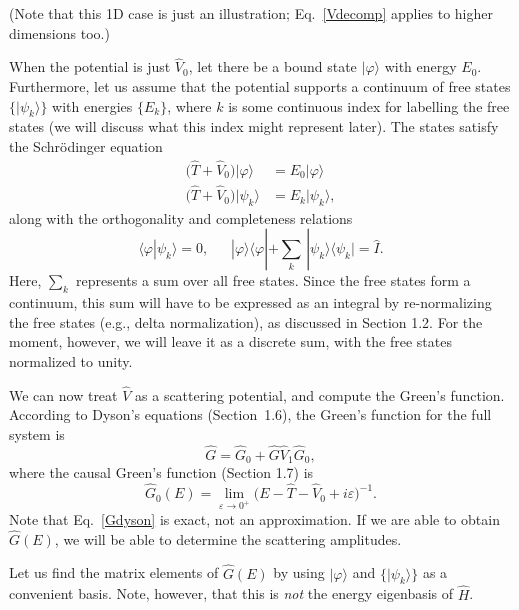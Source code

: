 \documentclass[pra,12pt]{revtex4}
\begin{document}
\noindent
(Note that this 1D case is just an illustration; Eq.~\eqref{Vdecomp}
applies to higher dimensions too.)

When the potential is just $\hat{V}_0$, let there be a bound state
$|\varphi\rangle$ with energy $E_0$.  Furthermore, let us assume that
the potential supports a continuum of free states $\{|\psi_k\rangle\}$
with energies $\{E_k\}$, where $k$ is some continuous index for
labelling the free states (we will discuss what this index might
represent later).  The states satisfy the Schr\"odinger equation
\begin{align}
  \big(\hat{T} + \hat{V}_0\big) |\varphi\rangle \; &= E_0 |\varphi\rangle \\ \big(\hat{T} + \hat{V}_0\big) |\psi_k\rangle &= E_k |\psi_k\rangle,
\end{align}
along with the orthogonality and completeness relations
\begin{equation}
  \langle\varphi|\psi_k\rangle = 0, \;\;\quad |\varphi\rangle\langle\varphi|
  + \sum_k \, |\psi_k\rangle\langle\psi_k| = \hat{I}.
\end{equation}
Here, $\sum_k$ represents a sum over all free states.  Since the free
states form a continuum, this sum will have to be expressed as an
integral by re-normalizing the free states (e.g., delta
normalization), as discussed in Section 1.2.  For the moment, however,
we will leave it as a discrete sum, with the free states normalized to
unity.

We can now treat $\hat{V}$ as a scattering potential, and compute the
Green's function.  According to Dyson's equations (Section~1.6), the
Green's function for the full system is
\begin{equation}
  \hat{G} = \hat{G}_0 + \hat{G} \hat{V}_1 \hat{G}_0,
  \label{Gdyson}
\end{equation}
where the causal Green's function (Section 1.7) is
\begin{equation}
  \hat{G}_0(E) = \lim_{\varepsilon\rightarrow0^+}
  \Big(E - \hat{T} - \hat{V}_0 + i\varepsilon\Big)^{-1}.
\end{equation}
Note that Eq.~\eqref{Gdyson} is exact, not an approximation.  If we
are able to obtain $\hat{G}(E)$, we will be able to determine the
scattering amplitudes.

Let us find the matrix elements of $\hat{G}(E)$ by using
$|\varphi\rangle$ and $\{|\psi_k\rangle\}$ as a convenient basis.
Note, however, that this is \textit{not} the energy eigenbasis of
$\hat{H}$.
\end{document}
